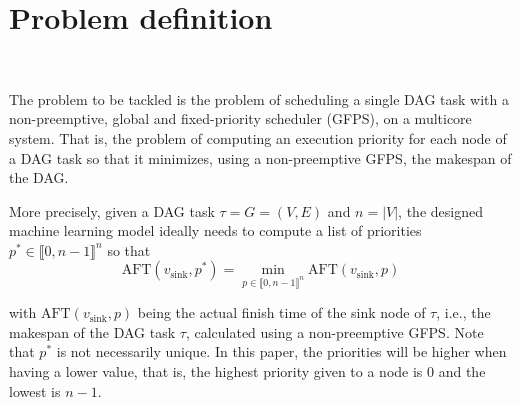 \section{Problem definition}
~

The problem to be tackled is the problem of scheduling a single DAG task with a non-preemptive, global and fixed-priority scheduler (GFPS),
on a multicore system. That is, the problem of computing an execution priority for each node of a DAG task so that it minimizes, 
using a non-preemptive GFPS, the makespan of the DAG.

More precisely, given a DAG task $\tau = G = (V, E)$ and $n = \left\lvert V \right\rvert$, the designed machine learning model 
ideally needs to compute a list of priorities $p^* \in \llbracket 0, n-1 \rrbracket^{n}$
so that 
$$
    \text{AFT}(v_{\text{sink}}, p^*) = \min_{p \in \llbracket 0, n-1 \rrbracket^{n}} \text{AFT}(v_{\text{sink}}, p)
$$

with $\text{AFT}(v_{\text{sink}}, p)$ being the actual finish time of the
sink node of $\tau$, i.e., the makespan of the DAG task $\tau$,
calculated using a non-preemptive GFPS. Note that $p^*$ is not necessarily unique.
In this paper, the priorities will be higher when having a lower value,
that is, the highest priority given to a node is 0 and the lowest is $n-1$.

%
